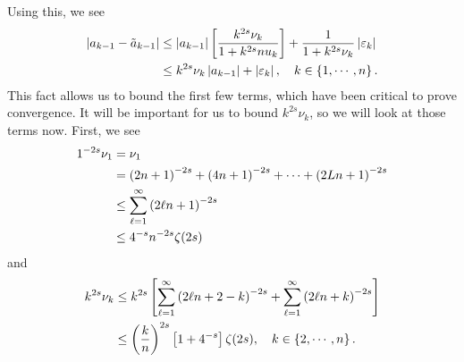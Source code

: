 Using this, we see
%
\begin{align}
    \left| a_{k-1} - \tilde{a}_{k-1} \right|
        &\le \left| a_{k-1} \right|\left[ \frac{k^{2s}\nu_{k}}{1+k^{2s}nu_{k}} \right]
        + \frac{1}{1+k^{2s}\nu_{k}}\left| \varepsilon_{k} \right| \nonumber\\
    &\le k^{2s}\nu_{k}\left| a_{k-1} \right| + \left| \varepsilon_{k} \right|,
    \quad k\in\left\{ 1,\cdots,n \right\}.
\end{align}
%
This fact allows us to bound the first few terms, which have been
critical to prove convergence.
It will be important for us to bound $k^{2s}\nu_{k}$, so we will look
at those terms now.
First, we see
%
\begin{align}
    1^{-2s}\nu_{1} &= \nu_{1} \nonumber\\
    &= \left( 2n+1 \right)^{-2s} + \left( 4n+1 \right)^{-2s} + \cdots + \left( 2Ln+1 \right)^{-2s}
        \nonumber\\
    &\le \sum_{\ell=1}^{\infty}\left( 2\ell n+1 \right)^{-2s} \nonumber\\
    &\le 4^{-s}n^{-2s}\zeta(2s)
\end{align}
%
and
%
\begin{align}
    k^{2s}\nu_{k} &\le k^{2s}\left[ 
        \sum_{\ell=1}^{\infty}\left( 2\ell n+2-k \right)^{-2s} + 
        \sum_{\ell=1}^{\infty}\left( 2\ell n+k \right)^{-2s} \right] \nonumber\\
    &\le \left( \frac{k}{n} \right)^{2s}\left[ 1+4^{-s} \right]\zeta(2s),
    \quad k\in\left\{ 2,\cdots,n \right\}.
\end{align}


